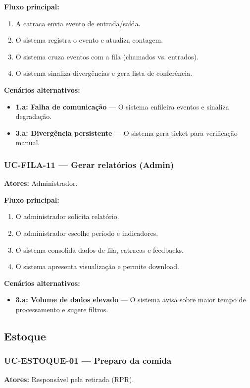 \documentclass[12pt,a4paper]{article}
\begin{document}
\textbf{Fluxo principal:}
\begin{enumerate}
    \item A catraca envia evento de entrada/saída.
    \item O sistema registra o evento e atualiza contagem.
    \item O sistema cruza eventos com a fila (chamados vs. entrados).
    \item O sistema sinaliza divergências e gera lista de conferência.
\end{enumerate}

\textbf{Cenários alternativos:}
\begin{itemize}
    \item \textbf{1.a: Falha de comunicação} — O sistema enfileira eventos e sinaliza degradação.
    \item \textbf{3.a: Divergência persistente} — O sistema gera ticket para verificação manual.
\end{itemize}

\subsubsection{UC-FILA-11 — Gerar relatórios (Admin)}
\textbf{Atores:} Administrador.  

\textbf{Fluxo principal:}
\begin{enumerate}
    \item O administrador solicita relatório.
    \item O administrador escolhe período e indicadores.
    \item O sistema consolida dados de fila, catracas e feedbacks.
    \item O sistema apresenta visualização e permite download.
\end{enumerate}

\textbf{Cenários alternativos:}
\begin{itemize}
    \item \textbf{3.a: Volume de dados elevado} — O sistema avisa sobre maior tempo de processamento e sugere filtros.
\end{itemize}

\subsection{Estoque}

\subsubsection{UC-ESTOQUE-01 — Preparo da comida}
\textbf{Atores:} Responsável pela retirada (RPR).  
\end{document}
